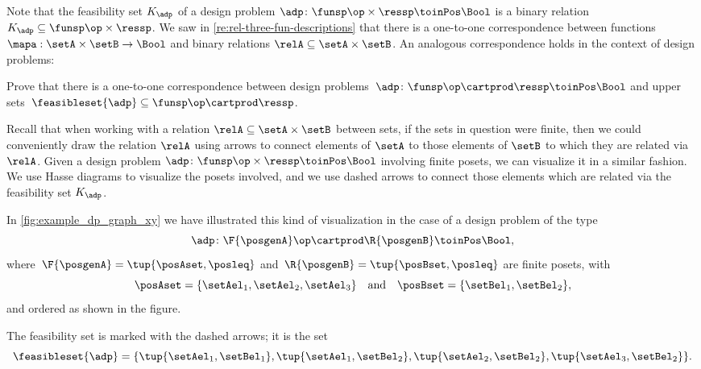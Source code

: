 Note that the feasibility set $K_\adp$ of a design problem $\adp \colon \funsp \op \times \ressp\toinPos \Bool$ is a binary relation $K_\adp \subseteq \funsp\op \times \ressp$.
We saw in \cref{re:rel-three-fun-descriptions} that there is a one-to-one correspondence between functions $\mapa : \setA \times \setB \to \Bool$ and binary relations $\relA \subseteq \setA \times \setB$.
An analogous correspondence holds in the context of design problems:

\begin{exercise}
    \label{ex:adp-uppersets}
    Prove that there is a one-to-one correspondence between design problems~$\adp \colon \funsp \op \cartprod \ressp\toinPos \Bool$ and upper sets~$\feasibleset{\adp} \subseteq \funsp\op \cartprod \ressp$.
\end{exercise}
\begin{solution}
\end{solution}

Recall that when working with a relation $\relA \subseteq \setA \times \setB$ between sets, if the sets in question were finite, then we could conveniently draw the relation $\relA$ using arrows to connect elements of $\setA$ to those elements of $\setB$ to which they are related via $\relA$.
Given a design problem $\adp \colon \funsp \op \times \ressp\toinPos \Bool$ involving finite posets, we can visualize it in a similar fashion.
We use Hasse diagrams to visualize the posets involved, and we use dashed arrows to connect those elements which are related via the feasibility set $K_\adp$.

\begin{marginfigure}
    \centering
    \caption{}
    \label{fig:example_dp_graph_xy}
\end{marginfigure}

\begin{example}
    \label{exa:visualize-dp}
    In \cref{fig:example_dp_graph_xy} we have illustrated this kind of visualization in the case of a design problem of the type
    \begin{equation*}
        \adp \colon \F{\posgenA} \op \cartprod  \R{\posgenB} \toinPos \Bool,
    \end{equation*}
    where~$\F{\posgenA} = \tup{\posAset, \posleq}$ and~$ \R{\posgenB} = \tup{\posBset, \posleq}$ are finite posets, with
    \begin{equation}
        \posAset = \{ \setAel_1, \setAel_2, \setAel_3 \}
        \quad \text{and} \quad
        \posBset =  \{ \setBel_1, \setBel_2\},
    \end{equation}
    and ordered as shown in the figure.
    
    The feasibility set is marked with the dashed arrows; it is the set
    \begin{equation*}
        \feasibleset{\adp} = \{\tup{\setAel_1, \setBel_1}, \tup{\setAel_1, \setBel_2}, \tup{\setAel_2, \setBel_2}, \tup{\setAel_3, \setBel_2} \}.
    \end{equation*}
\end{example}


